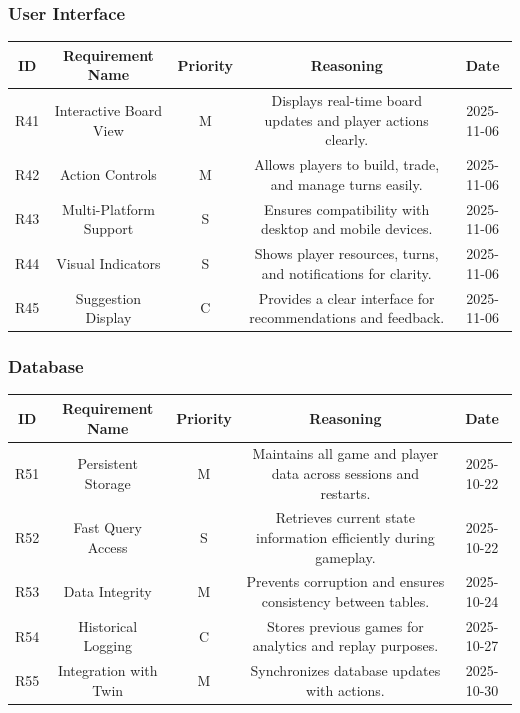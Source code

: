 \documentclass{article}
\begin{document}
\subsubsection*{User Interface}

\begin{tabular}{|c|c|c|c|c|}
\hline
\textbf{ID} & \textbf{Requirement Name} & \textbf{Priority} &
\textbf{Reasoning} & \textbf{Date} \\
\hline
R41 & Interactive Board View & M &
\parbox[t]{4cm}{Displays real-time board updates and player actions
clearly.} &
2025-11-06 \\
\hline
R42 & Action Controls & M &
\parbox[t]{4cm}{Allows players to build, trade, and manage turns
easily.} &
2025-11-06 \\
\hline
R43 & Multi-Platform Support & S &
\parbox[t]{4cm}{Ensures compatibility with desktop and mobile
devices.} &
2025-11-06 \\
\hline
R44 & Visual Indicators & S &
\parbox[t]{4cm}{Shows player resources, turns, and notifications for
clarity.} &
2025-11-06 \\
\hline
R45 & \AI{} Suggestion Display & C &
\parbox[t]{4cm}{Provides a clear interface for \AI{} recommendations
and feedback.} &
2025-11-06 \\
\hline
\end{tabular}

\vspace{1em}

\subsubsection*{\GameState{} Database}

\begin{tabular}{|c|c|c|c|c|}
\hline
\textbf{ID} & \textbf{Requirement Name} & \textbf{Priority} &
\textbf{Reasoning} & \textbf{Date} \\
\hline
R51 & Persistent Storage & M &
\parbox[t]{4cm}{Maintains all game and player data across sessions
and restarts.} &
2025-10-22 \\
\hline
R52 & Fast Query Access & S &
\parbox[t]{4cm}{Retrieves current state information efficiently
during gameplay.} &
2025-10-22 \\
\hline
R53 & Data Integrity & M &
\parbox[t]{4cm}{Prevents corruption and ensures consistency between
tables.} &
2025-10-24 \\
\hline
R54 & Historical Logging & C &
\parbox[t]{4cm}{Stores previous games for analytics and replay
purposes.} &
2025-10-27 \\
\hline
R55 & Integration with Twin & M &
\parbox[t]{4cm}{Synchronizes database updates with \DigitalTwin{}
actions.} &
2025-10-30 \\
\hline
\end{tabular}
\end{document}
